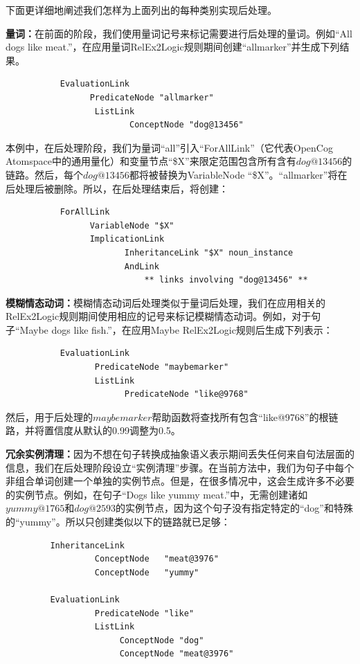 下面更详细地阐述我们怎样为上面列出的每种类别实现后处理。

{\bf 量词：}在前面的阶段，我们使用量词记号来标记需要进行后处理的量词。例如“All dogs like meat.”，在应用量词RelEx2Logic规则期间创建“allmarker”并生成下列结果。

\begin{verbatim}
           EvaluationLink
                 PredicateNode "allmarker"
                  ListLink
                         ConceptNode "dog@13456"
\end{verbatim}

本例中，在后处理阶段，我们为量词“all”引入“ForAllLink”（它代表OpenCog Atomspace中的通用量化）和变量节点“\$X”来限定范围包含所有含有$dog@13456$的链路。然后，每个$dog@13456$都将被替换为VariableNode “\$X”。“allmarker”将在后处理后被删除。所以，在后处理结束后，将创建：

\begin{verbatim}
           ForAllLink
                 VariableNode "$X"
                 ImplicationLink 
                        InheritanceLink "$X" noun_instance
                        AndLink
                            ** links involving "dog@13456" **
\end{verbatim}

{\bf 模糊情态动词：}模糊情态动词后处理类似于量词后处理，我们在应用相关的RelEx2Logic规则期间使用相应的记号来标记模糊情态动词。例如，对于句子“Maybe dogs like fish.”，在应用Maybe RelEx2Logic规则后生成下列表示：

\begin{verbatim}
           EvaluationLink
                  PredicateNode "maybemarker"
                  ListLink
                        PredicateNode "like@9768"
\end{verbatim}

然后，用于后处理的$maybemarker$帮助函数将查找所有包含“like@9768”的根链路，并将置信度从默认的0.99调整为0.5。

{\bf 冗余实例清理：}因为不想在句子转换成抽象语义表示期间丢失任何来自句法层面的信息，我们在后处理阶段设立“实例清理”步骤。在当前方法中，我们为句子中每个非组合单词创建一个单独的实例节点。但是，在很多情况中，这会生成许多不必要的实例节点。例如，在句子“Dogs like yummy meat.”中，无需创建诸如$yummy@1765$和$dog@2593$的实例节点，因为这个句子没有指定特定的“dog”和特殊的“yummy”。所以只创建类似以下的链路就已足够：

\begin{verbatim}
         InheritanceLink 
                  ConceptNode   "meat@3976" 
                  ConceptNode   "yummy"

         EvaluationLink 
                  PredicateNode "like"
                  ListLink
                       ConceptNode "dog"
                       ConceptNode "meat@3976"
\end{verbatim}

